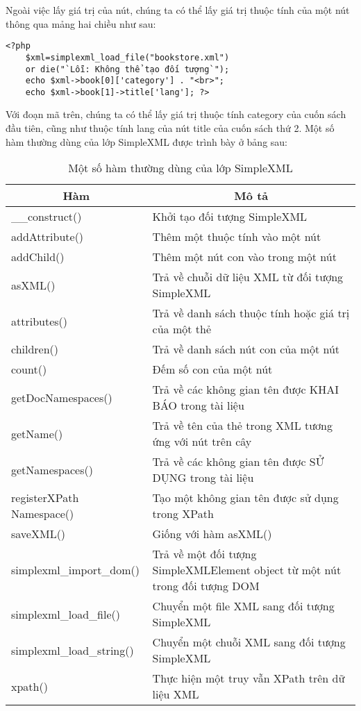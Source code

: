Ngoài việc lấy giá trị của nút, chúng ta có thể lấy giá trị thuộc tính của một nút thông qua mảng hai chiều như sau:
\lstset{language=XML}
\begin{lstlisting}[escapechar=`]
	<?php
	$xml=simplexml_load_file("bookstore.xml") 
	or die("`Lỗi: Không thể tạo đối tượng`");
	echo $xml->book[0]['category'] . "<br>";
	echo $xml->book[1]->title['lang']; ?>
\end{lstlisting}

Với đoạn mã trên, chúng ta có thể lấy giá trị thuộc tính category của cuốn sách đầu tiên, cũng như thuộc tính lang của nút title của cuốn sách thứ 2.
Một số hàm thường dùng của lớp SimpleXML được trình bày ở bảng sau:


\begin{center}
\begin{longtable}{|m{4.5cm}|m{7cm}|}
\caption [Một số hàm thường dùng của lớp SimpleXML]{Một số hàm thường dùng của lớp SimpleXML}
 \endfirsthead
 \endhead
\hline

\multicolumn{1}{|c|}{ \textbf{Hàm}}&	\multicolumn{1}{|c|}{\textbf{Mô tả}}\\ \hline
\_\_construct() &	Khởi tạo đối tượng SimpleXML\\ \hline
addAttribute() &	Thêm một thuộc tính vào một nút\\ \hline
addChild() &	Thêm một nút con vào trong một nút\\ \hline
asXML() &	Trả về chuỗi dữ liệu XML từ đối tượng SimpleXML\\ \hline
attributes() &	Trả về danh sách thuộc tính hoặc giá trị của một thẻ\\ \hline
children() &	Trả về danh sách nút con của một nút\\ \hline
count() &	Đếm số con của một nút\\ \hline
getDocNamespaces() &	Trả về các không gian tên được KHAI BÁO trong tài liệu\\ \hline
getName() &	Trả về tên của thẻ trong XML tương ứng với nút trên cây\\ \hline
getNamespaces() &	Trả về các không gian tên được SỬ DỤNG trong tài liệu\\ \hline
registerXPath Namespace() &	Tạo một không gian tên được sử dụng trong XPath\\ \hline
saveXML() &	Giống với hàm asXML()\\ \hline
simplexml\_import\_dom()&	Trả về một đối tượng SimpleXMLElement object từ một nút trong đối tượng DOM\\ \hline
simplexml\_load\_file() &	Chuyển một file XML sang đối tượng SimpleXML\\ \hline
simplexml\_load\_string()&	Chuyển một chuỗi XML sang đối tượng SimpleXML\\ \hline
xpath() &	Thực hiện một truy vẫn XPath trên dữ liệu XML\\ \hline

\end{longtable}
\end{center}
\vspace{-1cm}

